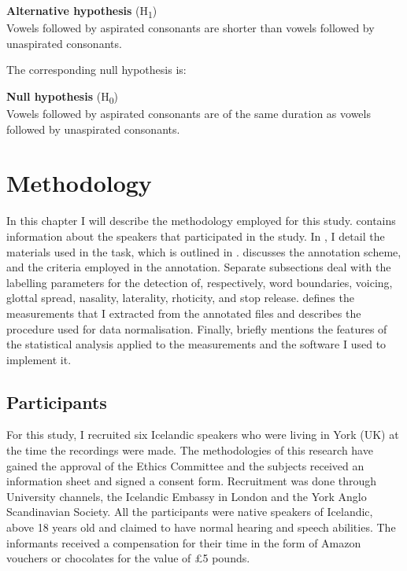 \documentclass[11pt,a4paper,openany]{memoir}\usepackage[]{graphicx}\usepackage[]{color}
\begin{document}
\begin{exe}
\ex\label{h1} \textbf{Alternative hypothesis} (H\textsubscript{1}) \\
Vowels followed by aspirated consonants are shorter than vowels followed by unaspirated consonants.
\end{exe}

The corresponding null hypothesis is:

\begin{exe}
\ex\label{h0} \textbf{Null hypothesis} (H\textsubscript{0}) \\
Vowels followed by aspirated consonants are of the same duration as vowels followed by unaspirated consonants.
\end{exe}








\chapter{Methodology}
\label{s:methodology}
In this chapter I will describe the methodology employed for this study.
 contains information about the speakers that participated in the study.
In , I detail the materials used in the task, which is outlined in .
 discusses the annotation scheme, and the criteria employed in the annotation.
Separate subsections deal with the labelling parameters for the detection of, respectively, word boundaries, voicing, glottal spread, nasality, laterality, rhoticity, and stop release.
 defines the measurements that I extracted from the annotated files and describes the procedure used for data normalisation.
Finally,  briefly mentions the features of the statistical analysis applied to the measurements and the software I used to implement it.

\section{Participants}
\label{s:participants}

For this study, I recruited six Icelandic speakers who were living in York (UK) at the time the recordings were made.
The methodologies of this research have gained the approval of the Ethics Committee and the subjects received an information sheet and signed a consent form.
Recruitment was done through University channels, the Icelandic Embassy in London and the York Anglo Scandinavian Society.
All the participants were native speakers of Icelandic, above 18 years old and claimed to have normal hearing and speech abilities.
The informants received a compensation for their time in the form of Amazon vouchers or chocolates for the value of £5 pounds.
\end{document}
